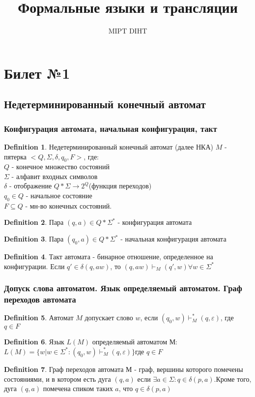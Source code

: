 \documentclass[a4paper]{article}
\title{Формальные языки и трансляции}
\author{MIPT DIHT}
\theoremstyle{plain}
\theoremstyle{remark}
\theoremstyle{definition}
\newtheorem*{definition-star}{Definition}
\begin{document}
\maketitle

\section{Билет №1}
\subsection{Недетерминированный конечный автомат}
\subsubsection{Конфигурация автомата, начальная конфигурация, такт}
\begin{definition-star} Недетерминированный конечный автомат (далее НКА)  $M$ - пятерка $<Q,\Sigma,\delta,q_0,F>$, где:\\
$Q$ - конечное множество состояний\\
$\Sigma$ - алфавит входных символов\\
$\delta$ - отображение $Q*\Sigma \rightarrow 2^Q$(функция переходов)\\
$q_0 \in Q$ - начальное состояние\\
$F \subseteq Q $ - мн-во конечных состояний.
\end{definition-star}
\begin{definition-star} Пара $(q,a) \in Q*\Sigma^*$ - конфигурация автомата
\end{definition-star}
\begin{definition-star} Пара $(q_0,a) \in Q*\Sigma^*$ - начальная конфигурация автомата
\end{definition-star}
\begin{definition-star}  Такт автомата - бинарное отношение, определенное на конфигурации. Если $q' \in \delta(q,aw)$, то $(q,aw) \vdash_M (q',w)  \forall w \in \Sigma^*$
\end{definition-star}
\subsubsection{Допуск слова автоматом. Язык определяемый автоматом. Граф переходов автомата}
\begin{definition-star} Автомат $M$ допускает слово $w$, если  $(q_0,w) \vdash^*_M (q,\varepsilon)$, где $q \in F$
\end{definition-star}
\begin{definition-star} Язык $L(M)$ определяемый автоматом $М$: $L(M)=\{w| w \in \Sigma^*: (q_0,w) \vdash^*_M (q,\varepsilon) \} $где $q \in F$
\end{definition-star}
\begin{definition-star}  Граф переходов автомата $М$ - граф, вершины которого помечены состояниями, и в котором есть дуга $(q,a)$ если  $\exists  a \in \Sigma : q \in \delta(p,a)$.Кроме того, дуга $(q,a)$ помечена спиком таких $a$, что $q \in \delta(p,a)$
\end{definition-star}
\end{document}
